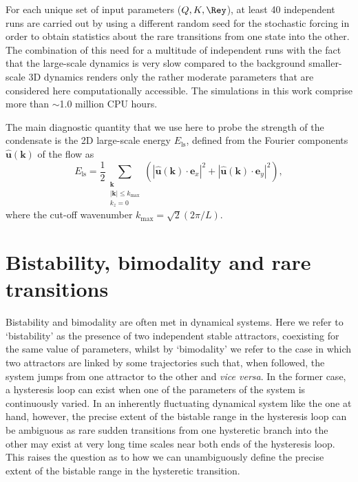 \documentclass[]{jfm}
\begin{document}
For each unique set of input parameters ($Q,K,\Rey$), at least 40 independent runs are carried out by using a different random seed for the stochastic forcing in order to obtain statistics about the rare transitions from one state into the other. The combination of this need for a multitude of independent runs with the fact that the large-scale dynamics is very slow compared to the background smaller-scale 3D dynamics renders only the rather moderate parameters that are considered here computationally accessible. The simulations in this work comprise more than $\sim$1.0 million CPU hours.

The main diagnostic quantity that we use here to probe the strength of the condensate is the 2D large-scale energy $E_\textrm{ls}$, defined from the Fourier components $\hat{\boldsymbol{u}}(\boldsymbol{k})$ of the flow as
\begin{equation}
    E_\textrm{ls}=\frac{1}{2}\sum_{\substack{\boldsymbol{k}\\|\boldsymbol{k}|\leq k_\textrm{max}\\k_z=0}}\left(|\hat{\boldsymbol{u}}(\boldsymbol{k})\cdot\boldsymbol{e}_x|^2+|\hat{\boldsymbol{u}}(\boldsymbol{k})\cdot\boldsymbol{e}_y|^2\right),
\end{equation}
where the cut-off wavenumber $k_\textrm{max}=\sqrt{2}(2\pi/L)$.

\section{Bistability, bimodality and rare transitions}\label{sec:bistability} %
Bistability and bimodality are often met in dynamical systems. Here we refer to `bistability' as the presence of two independent stable attractors, coexisting for the same value of parameters, whilst by `bimodality' we refer to the case in which two attractors are linked by some trajectories such that, when followed, the system jumps from one attractor to the other and \textit{vice versa}. In the former case, a hysteresis loop can exist when one of the parameters of the system is continuously varied. In an inherently fluctuating dynamical system like the one at hand, however, the precise extent of the bistable range in the hysteresis loop can be ambiguous as rare sudden transitions from one hysteretic branch into the other may exist at very long time scales near both ends of the hysteresis loop. This raises the question as to how we can unambiguously define the precise extent of the bistable range in the hysteretic transition.
\end{document}

